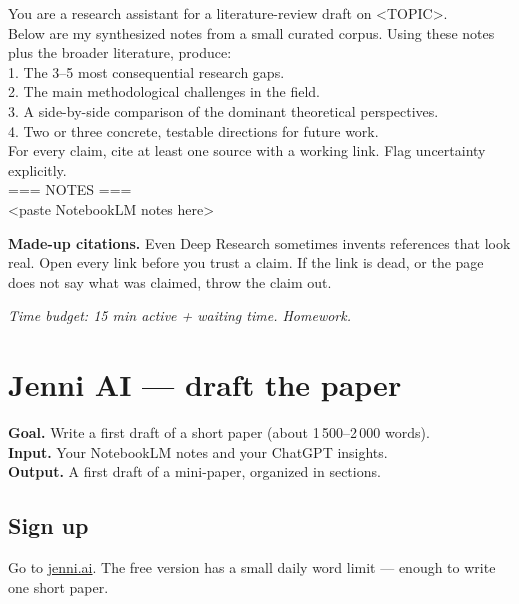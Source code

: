 \documentclass[11pt,a4paper]{article}
\begin{document}
\begin{promptbox}
You are a research assistant for a literature-review draft on <TOPIC>.\\
Below are my synthesized notes from a small curated corpus. Using these notes plus the broader literature, produce:\\
1. The 3--5 most consequential research gaps.\\
2. The main methodological challenges in the field.\\
3. A side-by-side comparison of the dominant theoretical perspectives.\\
4. Two or three concrete, testable directions for future work.\\
For every claim, cite at least one source with a working link. Flag uncertainty explicitly.\\[4pt]
=== NOTES ===\\
<paste NotebookLM notes here>
\end{promptbox}

\begin{watchout}
\textbf{Made-up citations.} Even Deep Research sometimes invents references that look real. Open every link before you trust a claim. If the link is dead, or the page does not say what was claimed, throw the claim out.
\end{watchout}

\textit{Time budget: 15 min active + waiting time. Homework.}

\section{Jenni AI --- draft the paper}
\label{sec:jenni}

\begin{toolheader}
\textbf{Goal.} Write a first draft of a short paper (about 1\,500--2\,000 words).\\
\textbf{Input.} Your NotebookLM notes and your ChatGPT insights.\\
\textbf{Output.} A first draft of a mini-paper, organized in sections.
\end{toolheader}

\subsection*{Sign up}
Go to \href{https://jenni.ai/}{jenni.ai}. The free version has a small daily word limit --- enough to write one short paper.
\end{document}

